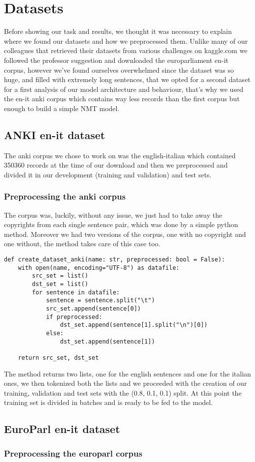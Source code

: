 \section{Datasets}\label{sec:dataset}
Before showing our task and results, we thought it was necessary to explain where we found our datasets and how we preprocessed them. Unlike many of our colleagues that retrieved their datasets from various challenges on kaggle.com we followed the professor suggestion and downloaded the europarliament en-it corpus, however we've found ourselves overwhelmed since the dataset was so huge, and filled with extremely long sentences, that we opted for a second dataset for a first analysis of our model architecture and behaviour, that's why we used the en-it anki corpus which contains way less records than the first corpus but enough to build a simple NMT model.
\subsection{ANKI en-it dataset}
The anki corpus we chose to work on was the english-italian which contained 350360 records at the time of our download and then we preprocessed and divided it in our development (training and validation) and test sets.
\subsubsection{Preprocessing the anki corpus}
The corpus was, luckily, without any issue, we just had to take away the copyrights from each single sentence pair, which was done by a simple python method. Moreover we had two versions of the corpus, one with no copyright and one without, the method takes care of this case too.
\begin{verbatim}
def create_dataset_anki(name: str, preprocessed: bool = False):
    with open(name, encoding="UTF-8") as datafile:
        src_set = list()
        dst_set = list()
        for sentence in datafile:
            sentence = sentence.split("\t")
            src_set.append(sentence[0])
            if preprocessed:
                dst_set.append(sentence[1].split("\n")[0])
            else:
                dst_set.append(sentence[1])

    return src_set, dst_set
\end{verbatim}
The method returns two lists, one for the english sentences and one for the italian ones, we then tokenized both the lists and we proceeded with the creation of our training, validation and test sets with the (0.8, 0.1, 0.1) split.
At this point the training set is divided in batches and is ready to be fed to the model.
\subsection{EuroParl en-it dataset}
\subsubsection{Preprocessing the europarl corpus}